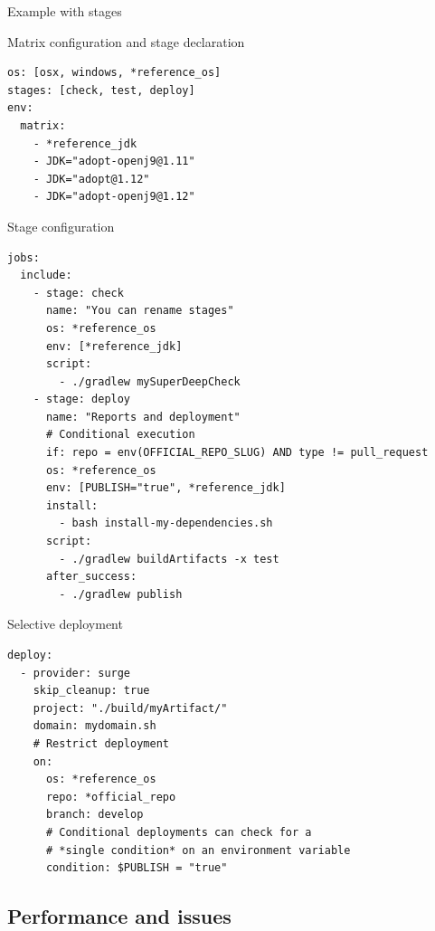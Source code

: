 \documentclass[presentation]{beamer}
\begin{document}
\begin{frame}{Example with stages}
    \begin{block}{Matrix configuration and stage declaration}
        \begin{verbatim}
os: [osx, windows, *reference_os]
stages: [check, test, deploy]
env:
  matrix:
    - *reference_jdk
    - JDK="adopt-openj9@1.11"
    - JDK="adopt@1.12"
    - JDK="adopt-openj9@1.12"
        \end{verbatim}
    \end{block}
    \begin{block}{Stage configuration}
        \begin{verbatim}
jobs:
  include:
    - stage: check
      name: "You can rename stages"
      os: *reference_os
      env: [*reference_jdk]
      script:
        - ./gradlew mySuperDeepCheck
    - stage: deploy
      name: "Reports and deployment"
      # Conditional execution
      if: repo = env(OFFICIAL_REPO_SLUG) AND type != pull_request
      os: *reference_os
      env: [PUBLISH="true", *reference_jdk]
      install:
        - bash install-my-dependencies.sh
      script:
        - ./gradlew buildArtifacts -x test
      after_success:
        - ./gradlew publish
        \end{verbatim}
    \end{block}
    \begin{block}{Selective deployment}
        \begin{verbatim}
deploy:
  - provider: surge
    skip_cleanup: true
    project: "./build/myArtifact/"
    domain: mydomain.sh
    # Restrict deployment
    on:
      os: *reference_os
      repo: *official_repo
      branch: develop
      # Conditional deployments can check for a
      # *single condition* on an environment variable
      condition: $PUBLISH = "true"
        \end{verbatim}
    \end{block}
\end{frame}


% 

\subsection{Performance and issues}
\end{document}
